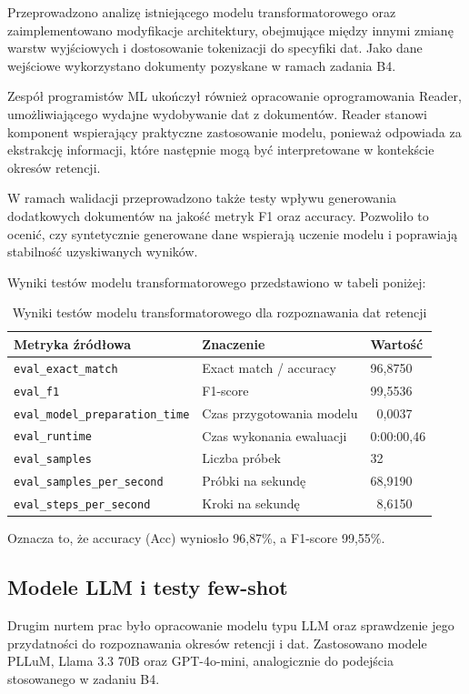 \documentclass[12pt,a4paper]{report}
\begin{document}
Przeprowadzono analizę istniejącego modelu transformatorowego oraz zaimplementowano modyfikacje architektury, obejmujące między innymi zmianę warstw wyjściowych i dostosowanie tokenizacji do specyfiki dat. Jako dane wejściowe wykorzystano dokumenty pozyskane w ramach zadania B4.

Zespół programistów ML ukończył również opracowanie oprogramowania Reader, umożliwiającego wydajne wydobywanie dat z dokumentów. Reader stanowi komponent wspierający praktyczne zastosowanie modelu, ponieważ odpowiada za ekstrakcję informacji, które następnie mogą być interpretowane w kontekście okresów retencji.

W ramach walidacji przeprowadzono także testy wpływu generowania dodatkowych dokumentów na jakość metryk F1 oraz accuracy. Pozwoliło to ocenić, czy syntetycznie generowane dane wspierają uczenie modelu i poprawiają stabilność uzyskiwanych wyników.

Wyniki testów modelu transformatorowego przedstawiono w tabeli poniżej:

\begin{table}[h]
    \centering
    \caption{Wyniki testów modelu transformatorowego dla rozpoznawania dat retencji}
    \begin{tabular}{l l l}
        \toprule
        Metryka źródłowa & Znaczenie & Wartość \\
        \midrule
        \texttt{eval\_exact\_match} & Exact match / accuracy & 96{,}8750 \\
        \texttt{eval\_f1} & F1-score & 99{,}5536 \\
        \texttt{eval\_model\_preparation\_time} & Czas przygotowania modelu & ~0{,}0037 \\
        \texttt{eval\_runtime} & Czas wykonania ewaluacji & 0:00:00{,}46 \\
        \texttt{eval\_samples} & Liczba próbek & 32 \\
        \texttt{eval\_samples\_per\_second} & Próbki na sekundę & 68{,}9190 \\
        \texttt{eval\_steps\_per\_second} & Kroki na sekundę & ~8{,}6150 \\
        \bottomrule
    \end{tabular}
\end{table}

Oznacza to, że accuracy (Acc) wyniosło 96{,}87\%, a F1-score 99{,}55\%.

\subsection{Modele LLM i testy few-shot}
Drugim nurtem prac było opracowanie modelu typu LLM oraz sprawdzenie jego przydatności do rozpoznawania okresów retencji i dat. Zastosowano modele PLLuM, Llama 3.3 70B oraz GPT-4o-mini, analogicznie do podejścia stosowanego w zadaniu B4.
\end{document}
